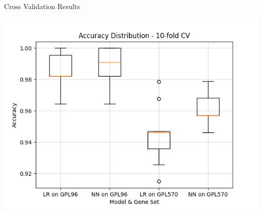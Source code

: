\documentclass{beamer}
\begin{document}
    \begin{frame}{Cross Validation Results}
        \begin{center}
            \hspace{10pt}
            \includegraphics[scale=.65]{AccuracyDist.png}
        \end{center}
    \end{frame}
\end{document}

